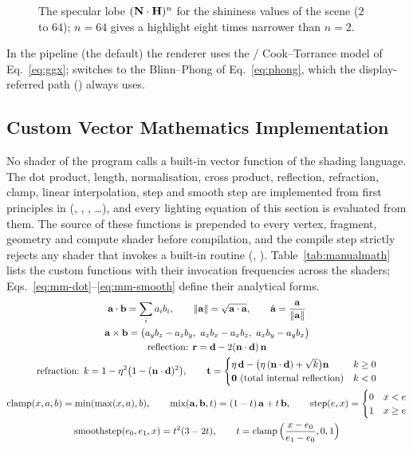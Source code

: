 \begin{figure}[htbp]
\centering{}
\caption{The specular lobe $(\mathbf{N}\cdot\mathbf{H})^n$ for the shininess values of the scene (2 to 64); $n=64$ gives a
highlight eight times narrower than $n=2$.}
\label{fig:spec}
\end{figure}


In the  pipeline (the default) the renderer uses the  / Cook--Torrance model of Eq.~\eqref{eq:ggx}; 
switches to the Blinn--Phong of Eq.~\eqref{eq:phong}, which the display-referred path () always uses.

\subsection{Custom Vector Mathematics Implementation}
\label{sec:manualmath}
No shader of the program calls a built-in vector function of the shading language. The dot product, length,
normalisation, cross product, reflection, refraction, clamp, linear interpolation, step and smooth step are implemented
from first principles in  (, , , \dots),
and every lighting equation of this section is evaluated from them. The source of these functions is prepended to
every vertex, fragment, geometry and compute shader before compilation, and the compile step strictly rejects any shader that
invokes a  built-in routine (, ). Table~\ref{tab:manualmath} lists the
custom functions with their invocation frequencies across the shaders; Eqs.~\eqref{eq:mm-dot}--\eqref{eq:mm-smooth} define their analytical forms.
\begin{gather}
\mathbf{a}\cdot\mathbf{b}=\sum_i a_i b_i,\qquad \lVert\mathbf{a}\rVert=\sqrt{\mathbf{a}\cdot\mathbf{a}},\qquad
\hat{\mathbf{a}}=\frac{\mathbf{a}}{\lVert\mathbf{a}\rVert}\label{eq:mm-dot}\\
\mathbf{a}\times\mathbf{b}=\big(a_y b_z-a_z b_y,\ a_z b_x-a_x b_z,\ a_x b_y-a_y b_x\big)\label{eq:mm-cross}\\
\text{reflection: } \mathbf{r}=\mathbf{d}-2(\mathbf{n}\cdot\mathbf{d})\,\mathbf{n}\label{eq:mm-reflect}\\
\text{refraction: } k=1-\eta^2\big(1-(\mathbf{n}\cdot\mathbf{d})^2\big),\qquad
\mathbf{t}=\begin{cases}\eta\,\mathbf{d}-\big(\eta\,(\mathbf{n}\cdot\mathbf{d})+\sqrt k\big)\mathbf{n} & k\ge 0\\ \mathbf{0}\ \text{(total internal reflection)} & k<0\end{cases}\label{eq:mm-refract}\\
\operatorname{clamp}(x,a,b)=\min(\max(x,a),b),\qquad \operatorname{mix}(\mathbf{a},\mathbf{b},t)=(1-t)\,\mathbf{a}+t\,\mathbf{b},\qquad
\operatorname{step}(e,x)=\begin{cases}0 & x<e\\ 1 & x\ge e\end{cases}\label{eq:mm-mix}\\
\operatorname{smoothstep}(e_0,e_1,x)=t^2(3-2t),\qquad t=\operatorname{clamp}\Big(\frac{x-e_0}{e_1-e_0},0,1\Big)\label{eq:mm-smooth}
\end{gather}
